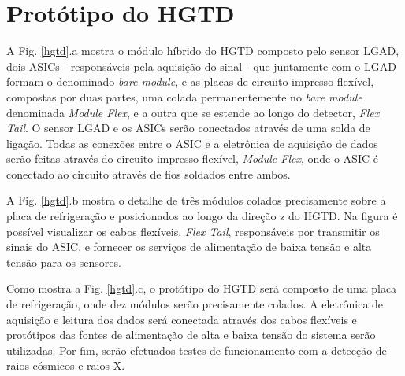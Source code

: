 \section{Protótipo do HGTD}

A Fig. \ref{hgtd}.a mostra o módulo híbrido do HGTD composto pelo sensor LGAD, dois ASICs - responsáveis pela aquisição do sinal - que juntamente com o LGAD formam o denominado \textit{bare module}, e as placas de circuito impresso flexível, compostas por duas partes, uma colada permanentemente no \textit{bare module} denominada \textit{Module Flex}, e a outra que se estende ao longo do detector, \textit{Flex Tail}. O sensor LGAD e os ASICs serão conectados através de uma solda de ligação. Todas as conexões entre o ASIC e a eletrônica de aquisição de dados serão feitas através do circuito impresso flexível, \textit{Module Flex}, onde o ASIC é conectado ao circuito através de fios soldados entre ambos.    

A Fig. \ref{hgtd}.b mostra o detalhe de três módulos colados precisamente sobre a placa de refrigeração e posicionados ao longo da direção z do HGTD. Na figura é possível visualizar os cabos flexíveis, \textit{Flex Tail}, responsáveis por transmitir os sinais do ASIC, e fornecer os serviços de alimentação de baixa tensão e alta tensão para os sensores. 

Como mostra a Fig. \ref{hgtd}.c, o protótipo do HGTD será composto de uma placa de refrigeração, onde dez módulos serão precisamente colados. A eletrônica de aquisição e leitura dos dados será conectada através dos cabos flexíveis e protótipos das fontes de alimentação de alta e baixa tensão do sistema serão utilizadas. Por fim, serão efetuados testes de funcionamento com a detecção de raios cósmicos e raios-X.    

